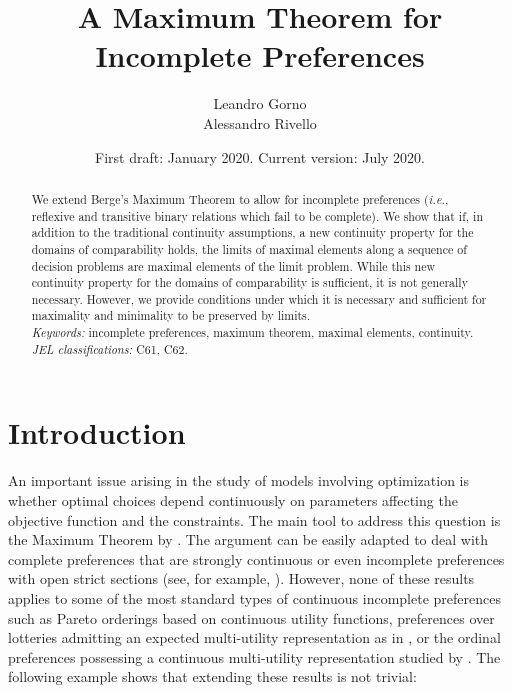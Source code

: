 \documentclass[12pt, oneside]{amsart}
\title{A Maximum Theorem for Incomplete Preferences}
\author{Leandro Gorno\\Alessandro Rivello}
\date{First draft: January 2020. Current version: July 2020.}
\theoremstyle{definition}
\begin{document}
\begin{abstract}
We extend Berge's Maximum Theorem to allow for incomplete preferences (\textit{i.e.}, reflexive and transitive binary relations which fail to be complete). We show that if, in addition to the traditional continuity assumptions, a new continuity property for the domains of comparability holds, the limits of maximal elements along a sequence of decision problems are maximal elements of the limit problem. While this new continuity property for the domains of comparability is sufficient, it is not generally necessary. However, we provide conditions under which it is necessary and sufficient for maximality and minimality to be preserved by limits.\vspace{10pt}\\
\noindent \textit{Keywords:} incomplete preferences, maximum theorem, maximal elements, continuity.\vspace{10pt}\\
\noindent \textit{JEL classifications:} C61, C62.
\end{abstract}



\maketitle



\section{Introduction}
An important issue arising in the study of models involving optimization is whether optimal choices depend continuously on parameters affecting the objective function and the constraints. The main tool to address this question is the Maximum Theorem by \citet*{Berge1963}. The argument can be easily adapted to deal with complete preferences that are strongly continuous or even incomplete preferences with open strict sections (see, for example, \citet*{Walker1979}). However, none of these results applies to some of the most standard types of continuous incomplete preferences such as Pareto orderings based on continuous utility functions, preferences over lotteries admitting an expected multi-utility representation as in \citet*{Dubra2004}, or the ordinal preferences possessing a continuous multi-utility representation studied by \citet*{Evren2011}. The following example shows that extending these results is not trivial:
\end{document}
